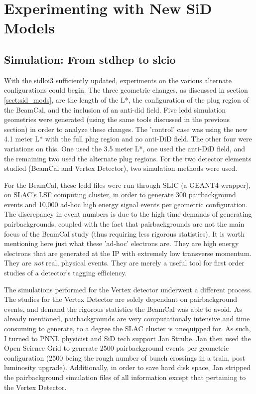\documentclass{report}
\begin{document}
        \section{Experimenting with New SiD Models}

            \subsection{Simulation: From stdhep to slcio}
                With the sidloi3 sufficiently updated, experiments on the various alternate configurations could begin. The three geometric changes, as discussed in section \ref{sect:sid_mods}, are the length of the L*, the configuration of the plug region of the BeamCal, and the inclusion of an anti-did field. Five lcdd simulation geometries were generated (using the same tools discussed in the previous section) in order to analyze these changes. The 'control' case was using the new 4.1 meter L* with the full plug region and no anti-DiD field. The other four were variations on this. One used the 3.5 meter L*, one used the anti-DiD field, and the remaining two used the alternate plug regions. For the two detector elements studied (BeamCal and Vertex Detector), two simulation methods were used. 

                For the BeamCal, these lcdd files were run through SLIC (a GEANT4 wrapper), on SLAC's LSF computing cluster, in order to generate 300 pairbackground events and 10,000 ad-hoc high energy signal events per geometric configuration. The discrepancy in event numbers is due to the high time demands of generating pairbackgrounds, coupled with the fact that pairbackgrounds are not the main focus of the BeamCal study (thus requiring less rigorous statistics). It is worth mentioning here just what these 'ad-hoc' electrons are. They are high energy electrons that are generated at the IP with extremely low transverse momentum. They are \textit{not} real, physical events. They are merely a useful tool for first order studies of a detector's tagging efficiency.

                The simulations performed for the Vertex detector underwent a different process. The studies for the Vertex Detector are solely dependant on pairbackground events, and demand the rigorous statistics the BeamCal was able to avoid. As already mentioned, pairbackgrounds are very computationaly intensive and time consuming to generate, to a degree the SLAC cluster is unequipped for. As such, I turned to PNNL physicist and SiD tech support Jan Strube. Jan then used the Open Science Grid to generate 2500 pairbackground events per geometric configuration (2500 being the rough number of bunch crossings in a train, post luminosity upgrade). Additionally, in order to save hard disk space, Jan stripped the pairbackground simulation files of all information except that pertaining to the Vertex Detector. 
\end{document}
